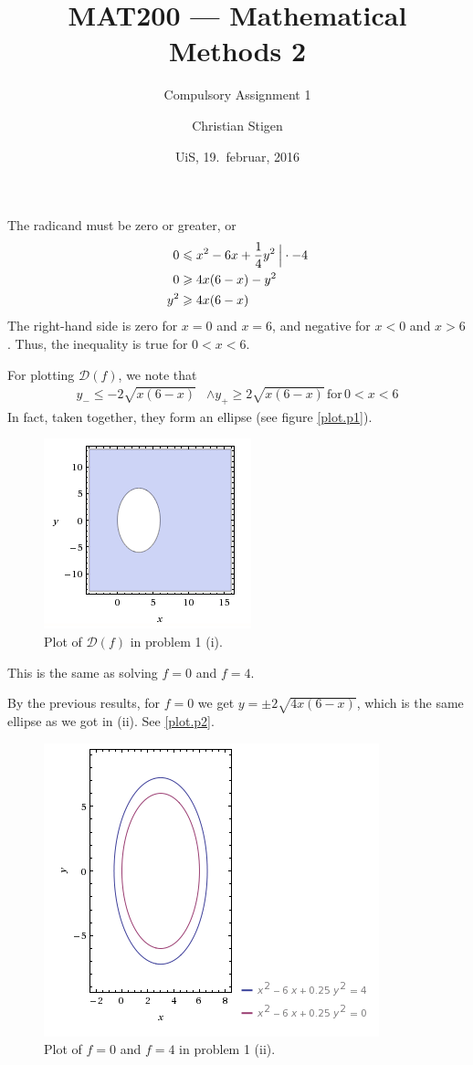 \documentclass[a4paper,norsk,12pt]{article}
\title{MAT200 --- Mathematical Methods 2}
\subtitle{Compulsory Assignment 1}
\author{Christian Stigen}
\date{UiS, 19.~februar, 2016}
\begin{document}
\maketitle

\label{problem.1}

The radicand must be zero or greater, or
\begin{align*}
  0 & \leqslant x^2-6x+\frac{1}{4}y^2 \> \Big{|} \cdot-4 \\
  0 & \geqslant 4x(6-x)-y^2 \\
  y^2 & \geqslant 4x(6-x)
\end{align*}
The right-hand side is zero for $x=0$ and $x=6$, and negative for $x<0$
and $x>6$. Thus, the inequality is true for $0 < x < 6$.

For plotting $\mathcal{D}(f)$, we note that
\begin{align*}
  y_{-} \leqslant -2\sqrt{x(6-x)} & \wedge y_{+} \geqslant 2\sqrt{x(6-x)}
  \,\text{for}\, 0<x<6
\end{align*}
In fact, taken together, they form an ellipse (see figure \vref{plot.p1}).

\begin{figure}[htp]
  \centering
  \includegraphics{ob1plot.png}
  \caption{Plot of $\mathcal{D}(f)$ in problem 1 (i).}
  \label{plot.p1}
\end{figure}


This is the same as solving $f=0$ and $f=4$.

By the previous results, for $f=0$ we get $y = \pm 2\sqrt{4x(6-x)}$, which is
the same ellipse as we got in (ii). See \vref{plot.p2}.

\begin{figure}[htp]
  \centering
  \includegraphics{ob1plot2.png}
  \caption{Plot of $f=0$ and $f=4$ in problem 1 (ii).}
  \label{plot.p2}
\end{figure}
\end{document}
